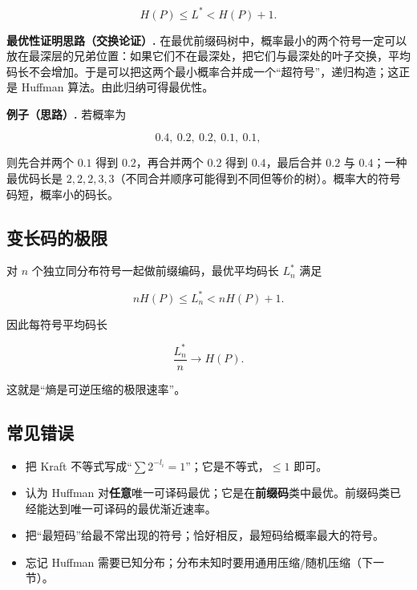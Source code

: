 \[
  H(P)\le L^*<H(P)+1.
\]

\textbf{最优性证明思路（交换论证）.} 在最优前缀码树中，概率最小的两个符号一定可以放在最深层的兄弟位置：如果它们不在最深处，把它们与最深处的叶子交换，平均码长不会增加。于是可以把这两个最小概率合并成一个“超符号”，递归构造；这正是 Huffman 算法。由此归纳可得最优性。

\textbf{例子（思路）.} 若概率为

\[
0.4,\ 0.2,\ 0.2,\ 0.1,\ 0.1,
\]

则先合并两个 $0.1$ 得到 $0.2$，再合并两个 $0.2$ 得到 $0.4$，最后合并 $0.2$ 与 $0.4$；一种最优码长是 $2,2,2,3,3$（不同合并顺序可能得到不同但等价的树）。概率大的符号码短，概率小的码长。

\subsection{变长码的极限}


对 $n$ 个独立同分布符号一起做前缀编码，最优平均码长 $L_n^*$ 满足

\[
nH(P)\le L_n^*<nH(P)+1.
\]

因此每符号平均码长

\[
\frac{L_n^*}{n}\to H(P).
\]

这就是“熵是可逆压缩的极限速率”。

\subsection{常见错误}


\begin{itemize}
\item 把 Kraft 不等式写成“$\sum2^{-l_i}=1$”；它是不等式，$\le1$ 即可。
\item 认为 Huffman 对\textbf{任意}唯一可译码最优；它是在\textbf{前缀码}类中最优。前缀码类已经能达到唯一可译码的最优渐近速率。
\item 把“最短码”给最不常出现的符号；恰好相反，最短码给概率最大的符号。
\item 忘记 Huffman 需要已知分布；分布未知时要用通用压缩/随机压缩（下一节）。
\end{itemize}
